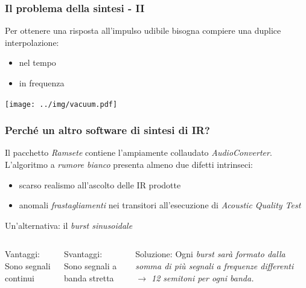 \documentclass[10pt]{beamer}
\begin{document}
\begin{frame}
  \frametitle{Il problema della sintesi - II}
  Per ottenere una risposta all'impulso udibile bisogna compiere una
  duplice interpolazione:
  \begin{itemize}
     \item nel tempo
     \item in frequenza
  \end{itemize}
   \pause
   \begin{center}
     \texttt{[image: ../img/vacuum.pdf]}
   \end{center}

\end{frame}

\begin{frame}
  \frametitle{Perch\'e un altro software di sintesi di IR?}
  Il pacchetto \emph{Ramsete} contiene l'ampiamente collaudato \emph{AudioConverter}.\\
  \vskip 0.7cm
  L'algoritmo a \emph{rumore bianco} presenta almeno due difetti intrinseci:
  \begin{block}{}
    \begin{itemize}
    \item scarso realismo all'ascolto delle IR prodotte
    \item anomali \emph{frastagliamenti} nei transitori all'esecuzione di 
      \emph{Acoustic Quality Test}
    \end{itemize}
  \end{block}

  \pause

  \vskip 0.7cm
  Un'alternativa: il \em burst \em sinusoidale

  \begin{columns}
    \column{5cm}
    \begin{block}{Vantaggi:}
      Sono segnali continui
    \end{block}

    \begin{block}{Svantaggi:}
      Sono segnali a banda stretta
    \end{block}

    \pause

    \column{5cm}
    \begin{block}{Soluzione:}
      Ogni \em burst \em sar\`a formato dalla somma di pi\`u segnali a frequenze
      differenti $\rightarrow$ 12 semitoni per ogni banda.
    \end{block}

  \end{columns}

\end{frame}
\end{document}
